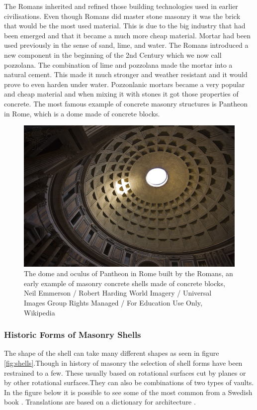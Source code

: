 The Romans inherited and refined those building technologies used in earlier civilisations. Even though Romans did master stone masonry it was the brick that would be the most used material. This is due to the big industry that had been emerged and that it became a much more cheap material. Mortar had been used previously in the sense of sand, lime, and water. The Romans introduced a new component in the beginning of the 2nd Century which we now call pozzolana. The combination of lime and pozzolana made the mortar into a natural cement. This made it much stronger and weather resistant and it would prove to even harden under water. Pozzonlanic mortars became a very popular and cheap material and when mixing it with stones it got those properties of concrete\cite{ref:buildConstrBrit}. The most famous example of concrete masonry structures is Pantheon in Rome, which is a dome made of concrete blocks.
\begin{figure}[H]
\centering
\includegraphics[width=0.9\linewidth ]{figure/Introduction/PantheonInt.jpg}
\caption{The dome and oculus of Pantheon in Rome built by the Romans, an early example of masonry concrete shells made of concrete blocks, Neil Emmerson / Robert Harding World Imagery / Universal Images Group
Rights Managed / For Education Use Only, Wikipedia}
\end{figure}


\subsubsection{Historic Forms of Masonry Shells} \label{sec:masonryShells}

The shape of the shell can take many different shapes as seen in figure \ref{fig:shells}.Though in history of masonry the selection of shell forms have been restrained to a few. These usually based on rotational surfaces cut by planes or by other rotational surfaces.They can also be combinations of two types of vaults. In the figure below it is possible to see some of the most common from a Swedish book \cite{ref:murning}. Translations are based on a dictionary for architecture \cite{ref:lexi}.


